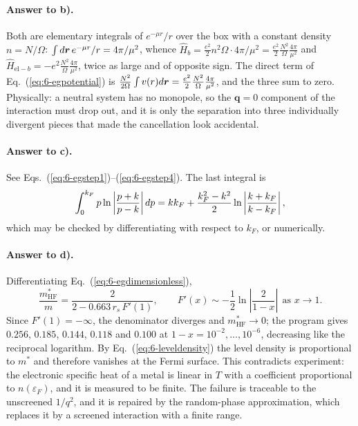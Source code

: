 \paragraph{Answer to b).}
Both are elementary integrals of $e^{-\mu r}/r$ over the box with a constant
density $n=N/\Omega$: $\int d\bm{r}\,e^{-\mu r}/r=4\pi/\mu^2$, whence
$\hat{H}_b=\tfrac{e^2}{2}n^2\Omega\cdot 4\pi/\mu^2
=\tfrac{e^2}{2}\tfrac{N^2}{\Omega}\tfrac{4\pi}{\mu^2}$ and
$\hat{H}_{\mathrm{el}-b}=-e^2\tfrac{N^2}{\Omega}\tfrac{4\pi}{\mu^2}$, twice as
large and of opposite sign.  The direct term of
Eq.~(\ref{eq:6-egpotential}) is $\tfrac{N^2}{2\Omega}\int v(r)d\bm{r}
=\tfrac{e^2}{2}\tfrac{N^2}{\Omega}\tfrac{4\pi}{\mu^2}$, and the three sum to
zero.  Physically: a neutral system has no monopole, so the $\bm{q}=0$
component of the interaction must drop out, and it is only the separation into
three individually divergent pieces that made the cancellation look accidental.

\paragraph{Answer to c).}
See Eqs.~(\ref{eq:6-egstep1})--(\ref{eq:6-egstep4}).  The last integral is
\begin{equation}
  \int_0^{k_F}p\ln\left\vert\frac{p+k}{p-k}\right\vert dp
  = kk_F + \frac{k_F^2-k^2}{2}
    \ln\left\vert\frac{k+k_F}{k-k_F}\right\vert ,
  \label{eq:6-exc6}
\end{equation}
which may be checked by differentiating with respect to $k_F$, or numerically.

\paragraph{Answer to d).}
Differentiating Eq.~(\ref{eq:6-egdimensionless}),
\begin{equation}
  \frac{m^{*}_{\mathrm{HF}}}{m}
  = \frac{2}{2-0.663\,r_s\,F'(1)},
  \qquad
  F'(x) \sim -\frac{1}{2}\ln\left\vert\frac{2}{1-x}\right\vert
  \ \ \text{as } x\to1 .
  \label{eq:6-exd6}
\end{equation}
Since $F'(1)=-\infty$, the denominator diverges and
$m^{*}_{\mathrm{HF}}\to0$; the program gives $0.256$, $0.185$, $0.144$,
$0.118$ and $0.100$ at $1-x=10^{-2},\dots,10^{-6}$, decreasing like the
reciprocal logarithm.  By Eq.~(\ref{eq:6-leveldensity}) the level density is
proportional to $m^{*}$ and therefore vanishes at the Fermi surface.  This
contradicts experiment: the electronic specific heat of a metal is linear in
$T$ with a coefficient proportional to $n(\varepsilon_F)$, and it is measured
to be finite.  The failure is traceable to the unscreened $1/q^2$, and it is
repaired by the random-phase approximation, which replaces it by a screened
interaction with a finite range.


